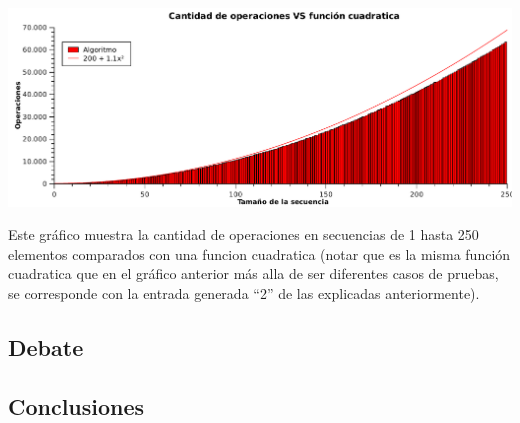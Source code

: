  
\hspace*{-2.1cm}\includegraphics[width=475pt]{../ej1/graficos/operaciones250.pdf}

Este gráfico muestra la cantidad de operaciones en secuencias de 1 hasta 250 elementos comparados con una funcion cuadratica (notar que es la misma función cuadratica que en el gráfico anterior más alla de ser diferentes casos de pruebas, se corresponde con la entrada generada ``2'' de las explicadas anteriormente).



\subsection{Debate}
\subsection{Conclusiones}

